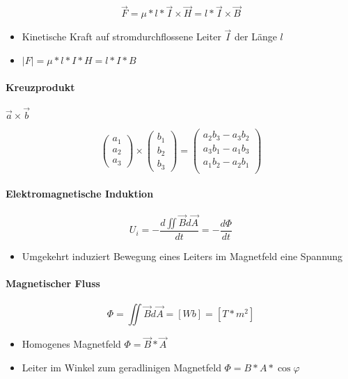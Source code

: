 $$\vec{F} = \mu * l * \vec{I} \times \vec{H} = l * \vec{I} \times \vec{B}$$

\begin{itemize}
  \item Kinetische Kraft auf stromdurchflossene Leiter $\vec{I}$ der Länge $l$
  \item $|F| = \mu * l * I * H = l * I * B$
\end{itemize}

\paragraph{Kreuzprodukt} $\vec{a} \times \vec{b}$

$$\begin{pmatrix}
    a_1 \\ a_2 \\ a_3
  \end{pmatrix} \times \begin{pmatrix}
    b_1 \\ b_2 \\ b_3
  \end{pmatrix} = \begin{pmatrix}
    a_2b_3 - a_3b_2 \\
    a_3b_1 - a_1b_3 \\
    a_1b_2 - a_2b_1 \\
  \end{pmatrix}$$

\paragraph{Elektromagnetische Induktion}

$$U_i = - \frac{d \iint \vec{B} d\vec{A}}{dt} = - \frac{d \Phi}{dt}$$

\begin{itemize}
  \item Umgekehrt induziert Bewegung eines Leiters im Magnetfeld eine Spannung
\end{itemize}

\paragraph{Magnetischer Fluss}

$$\Phi = \iint \vec{B} d \vec{A} = [Wb] = [T * m^2]$$

\begin{itemize}
  \item Homogenes Magnetfeld $\Phi = \vec{B} * \vec{A}$
  \item Leiter im Winkel zum geradlinigen Magnetfeld $\Phi = B * A * \cos \varphi$
\end{itemize}

